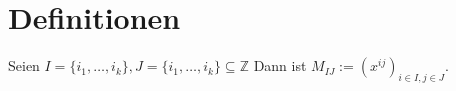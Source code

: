 \section{Definitionen}

\begin{definition}
    Seien $I = \{i_1,\dots,i_k\},J = \{i_1,\dots,i_k\} \subseteq \mathbb{Z}$ Dann ist $M_{IJ} := (x^{ij})_{i \in I, j \in J}$. 
\end{definition}